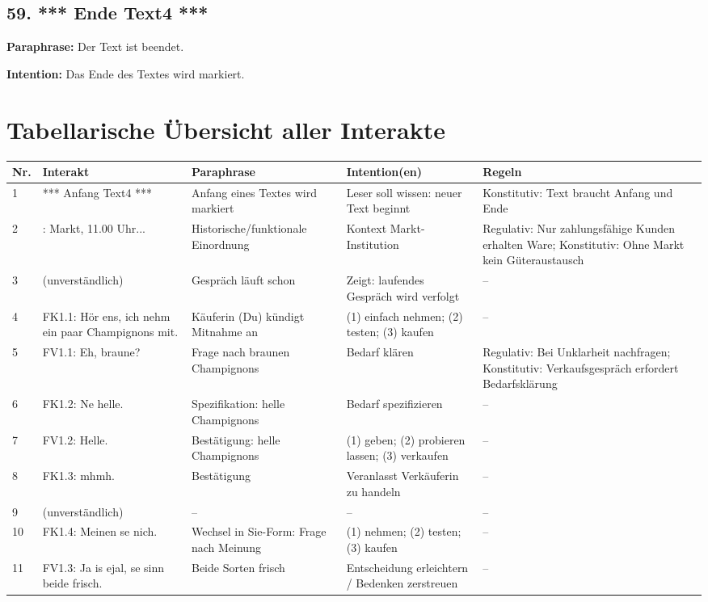 \documentclass[11pt]{article}
\begin{document}
\subsection*{59. *** Ende Text4 ***}

\textbf{Paraphrase:} Der Text ist beendet.

\textbf{Intention:} Das Ende des Textes wird markiert.

\newpage

\section{Tabellarische Übersicht aller Interakte}

\begin{longtable}{p{0.8cm}|p{3.5cm}|p{3.5cm}|p{3cm}|p{3cm}}
\hline
\textbf{Nr.} & \textbf{Interakt} & \textbf{Paraphrase} & \textbf{Intention(en)} & \textbf{Regeln} \\
\hline
1 & *** Anfang Text4 *** & Anfang eines Textes wird markiert & Leser soll wissen: neuer Text beginnt & Konstitutiv: Text braucht Anfang und Ende \\
2 & : Markt, 11.00 Uhr... & Historische/funktionale Einordnung & Kontext Markt-Institution & Regulativ: Nur zahlungsfähige Kunden erhalten Ware; Konstitutiv: Ohne Markt kein Güteraustausch \\
3 & (unverständlich) & Gespräch läuft schon & Zeigt: laufendes Gespräch wird verfolgt & – \\
4 & FK1.1: Hör ens, ich nehm ein paar Champignons mit. & Käuferin (Du) kündigt Mitnahme an & (1) einfach nehmen; (2) testen; (3) kaufen & – \\
5 & FV1.1: Eh, braune? & Frage nach braunen Champignons & Bedarf klären & Regulativ: Bei Unklarheit nachfragen; Konstitutiv: Verkaufsgespräch erfordert Bedarfsklärung \\
6 & FK1.2: Ne helle. & Spezifikation: helle Champignons & Bedarf spezifizieren & – \\
7 & FV1.2: Helle. & Bestätigung: helle Champignons & (1) geben; (2) probieren lassen; (3) verkaufen & – \\
8 & FK1.3: mhmh. & Bestätigung & Veranlasst Verkäuferin zu handeln & – \\
9 & (unverständlich) & – & – & – \\
10 & FK1.4: Meinen se nich. & Wechsel in Sie-Form: Frage nach Meinung & (1) nehmen; (2) testen; (3) kaufen & – \\
11 & FV1.3: Ja is ejal, se sinn beide frisch. & Beide Sorten frisch & Entscheidung erleichtern / Bedenken zerstreuen & – \\

\end{longtable}
\end{document}
